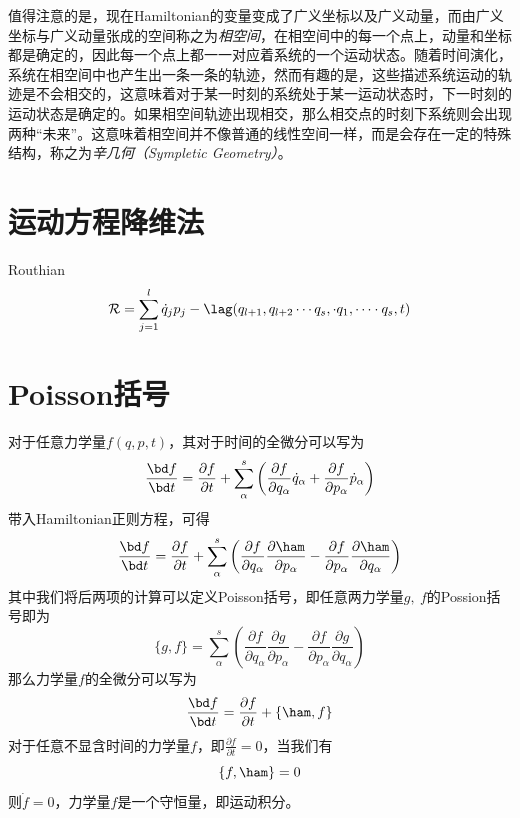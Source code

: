 值得注意的是，现在Hamiltonian的变量变成了广义坐标以及广义动量，而由广义坐标与广义动量张成的空间称之为\textit{{相空间}}，在相空间中的每一个点上，动量和坐标都是确定的，因此每一个点上都一一对应着系统的一个运动状态。随着时间演化，系统在相空间中也产生出一条一条的轨迹，然而有趣的是，这些描述系统运动的轨迹是不会相交的，这意味着对于某一时刻的系统处于某一运动状态时，下一时刻的运动状态是确定的。如果相空间轨迹出现相交，那么相交点的时刻下系统则会出现两种“未来”。这意味着相空间并不像普通的线性空间一样，而是会存在一定的特殊结构，称之为\textit{辛几何（Sympletic Geometry）}。

\section{运动方程降维法}
Routhian 
\begin{equation}
    \mathcal{R} = \sum_{j=1}^l \dot q_j p_j - \lag(q_{l+1},q_{l+2}\cdots q_s, \cdot q_1, \cdots\cdot q_s, t)
\end{equation}

\section{Poisson括号}
\label{sec:poisson_brak}
对于任意力学量$f(q,p,t)$，其对于时间的全微分可以写为
\begin{equation}
    \frac{\bd f}{\bd t} = \frac{\partial f}{\partial t} + \sum_\alpha^s\left( \frac{\partial f}{\partial q_\alpha}\dot q_\alpha + \frac{\partial f}{\partial p_\alpha}\dot p_\alpha \right)
\end{equation}
带入Hamiltonian正则方程，可得
\begin{equation}
    \frac{\bd f}{\bd t}= \frac{\partial f}{\partial t}+\sum_\alpha^s\left( \frac{\partial f}{\partial q_\alpha}\frac{\partial\ham}{\partial p_\alpha} - \frac{\partial f}{\partial p_\alpha}\frac{\partial\ham}{\partial q_\alpha} \right)
\end{equation}
其中我们将后两项的计算可以定义Poisson括号，即任意两力学量$g,~f$的Possion括号即为
\begin{equation}
    \{g,f\} = \sum_\alpha^s\left( \frac{\partial f}{\partial q_\alpha}\frac{\partial g}{\partial p_\alpha} - \frac{\partial f}{\partial p_\alpha}\frac{\partial g}{\partial q_\alpha} \right)
\end{equation}
那么力学量$f$的全微分可以写为
\begin{equation}
    \frac{\bd f}{\bd t} = \frac{\partial f}{\partial t} + \{\ham,f\}\label{eq:poissondef}
\end{equation}
对于任意不显含时间的力学量$f$，即$\frac{\partial f}{\partial t}=0$，当我们有
\begin{equation}
    \{ f,\ham\} = 0
\end{equation}
则$\dot f=0$，力学量$f$是一个守恒量，即运动积分。

